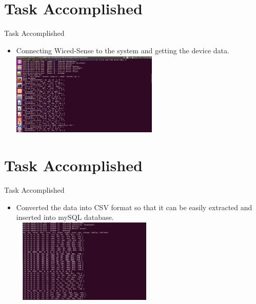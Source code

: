 \documentclass[10pt, a4paper]{beamer}
\begin{document}
\section{Task Accomplished}
\begin{frame}{Task Accomplished}
	\begin{itemize}
	   \item Connecting Wiced-Sense to the system and getting the device data. \\
	
	   \includegraphics[width=7cm, height=4cm]{ble-data.png}
	\end{itemize}
\end{frame}

\section{Task Accomplished}
\begin{frame}{Task Accomplished}
	\begin{itemize}
	  \item Converted the data into CSV format so that it can be easily extracted and inserted into mySQL database.  \\
	  
	  \includegraphics[width=7cm, height=4cm]{csvformat.png}
	\end{itemize}
\end{frame}
\end{document}
